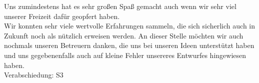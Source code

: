 \documentclass{scrartcl}
\begin{document}



	Uns zumindestens hat es sehr großen Spaß gemacht auch wenn wir sehr viel unserer Freizeit dafür geopfert haben. \\
	Wir konnten sehr viele wertvolle Erfahrungen sammeln, die sich sicherlich auch in Zukunft noch als nützlich erweisen werden. 	
	An dieser Stelle möchten wir auch nochmals unseren Betreuern danken, die uns bei unseren Ideen unterstützt haben und uns gegebenenfalls auch auf kleine Fehler unsereres Entwurfes hingewiesen haben. \\
	
	
	Verabschiedung: S3
     
\end{document}
